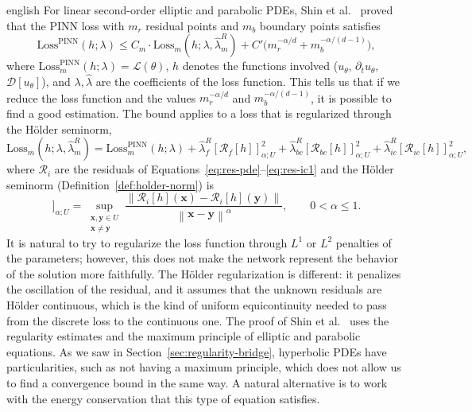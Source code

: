 \documentclass[12pt,letterpaper,twoside]{book}
\newcommand{\norm}[1]{\left\lVert #1 \right\rVert}
\newcommand{\Loss}{\mathcal{L}}
\newif\ifreviewmode
\newcommand{\revtag}[2]{\ifreviewmode{\color{red!70!black}\textsf{\footnotesize[#1#2]}}\fi}
\newcommand{\verificar}[1]{\revtag{VERIFICAR}{: #1}}
\begin{document}
\begin{hyphenrules}{english}
For linear second-order elliptic and parabolic PDEs, Shin et al.~\cite{shin2020convergence} proved that the
PINN loss with $m_r$ residual points and $m_b$ boundary points satisfies
\begin{equation}
  \mathrm{Loss}^{\mathrm{PINN}}(h;\lambda)\le C_m\cdot\mathrm{Loss}_m(h;\lambda,\hat\lambda^{R}_m)
  +C'\big(m_r^{-\alpha/d}+m_b^{-\alpha/(d-1)}\big),
  \label{eq:shin-bound}
\end{equation}
where $\mathrm{Loss}^{\mathrm{PINN}}_m(h;\lambda)=\Loss(\theta)$, $h$ denotes the functions involved
($u_\theta$, $\partial_t u_\theta$, $\mathcal{D}[u_\theta]$), and $\lambda,\hat\lambda$ are the
coefficients of the loss function.\verificar{exponents of $m_r$ and $m_b$ against the original}
This tells us that if we reduce the loss function and the values $m_r^{-\alpha/d}$ and
$m_b^{-\alpha/(d-1)}$, it is possible to find a good estimation. The bound applies to a loss that is
regularized through the Hölder seminorm,
\begin{equation}
  \mathrm{Loss}_m(h;\lambda,\hat\lambda^{R}_m)=\mathrm{Loss}^{\mathrm{PINN}}_m(h;\lambda)
  +\hat\lambda^{R}_f[\mathcal{R}_f[h]]^2_{\alpha;U}+\hat\lambda^{R}_{bc}[\mathcal{R}_{bc}[h]]^2_{\alpha;U}
  +\hat\lambda^{R}_{ic}[\mathcal{R}_{ic}[h]]^2_{\alpha;U},
  \label{eq:shin-regularized}
\end{equation}
where $\mathcal{R}_i$ are the residuals of Equations~\eqref{eq:res-pde}--\eqref{eq:res-ic1} and the Hölder seminorm
(Definition~\ref{def:holder-norm}) is
\begin{equation}
  [\mathcal{R}_i[h]]_{\alpha;U}=\sup_{\substack{\mathbf{x},\mathbf{y}\in U\\ \mathbf{x}\neq\mathbf{y}}}
  \frac{\norm{\mathcal{R}_i[h](\mathbf{x})-\mathcal{R}_i[h](\mathbf{y})}}{\norm{\mathbf{x}-\mathbf{y}}^{\alpha}},\qquad0<\alpha\le1.
  \label{eq:holder-seminorm-loss}
\end{equation}
It is natural to try to regularize the loss function through $L^1$ or $L^2$ penalties of the
parameters; however, this does not make the network represent the behavior of the solution more
faithfully. The Hölder regularization is different: it penalizes the oscillation of the residual, and it
assumes that the unknown residuals are Hölder continuous, which is the kind of uniform equicontinuity
needed to pass from the discrete loss to the continuous one. The proof of Shin et al.~\cite{shin2020convergence}
uses the regularity estimates and the maximum principle of elliptic and parabolic equations. As we saw
in Section~\ref{sec:regularity-bridge}, hyperbolic PDEs have particularities, such as not having a maximum
principle, which does not allow us to find a convergence bound in the same way. A natural alternative is
to work with the energy conservation that this type of equation satisfies.


\end{hyphenrules}
\end{document}
